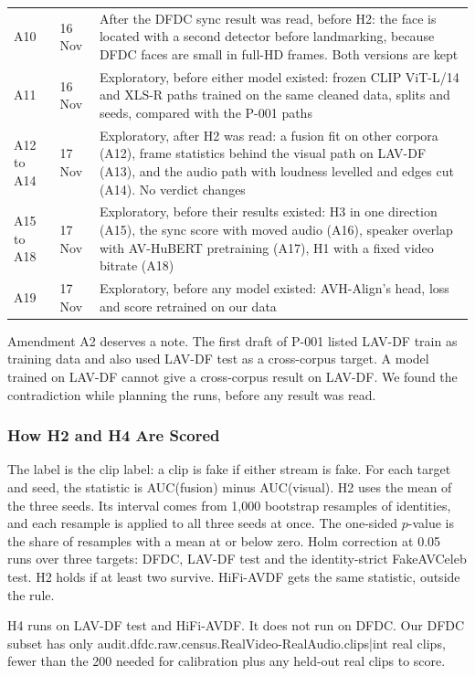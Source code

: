 \begin{table}[ht]
\begin{tabularx}{\textwidth}{@{}l l >{\raggedright\arraybackslash}X@{}}
        A10 & 16 Nov & After the DFDC sync result was read, before H2: the face is located with a second detector before landmarking, because DFDC faces are small in full-HD frames. Both versions are kept \\
        A11 & 16 Nov & Exploratory, before either model existed: frozen CLIP ViT-L/14 and XLS-R paths trained on the same cleaned data, splits and seeds, compared with the P-001 paths \\
        A12 to A14 & 17 Nov & Exploratory, after H2 was read: a fusion fit on other corpora (A12), frame statistics behind the visual path on LAV-DF (A13), and the audio path with loudness levelled and edges cut (A14). No verdict changes \\
        A15 to A18 & 17 Nov & Exploratory, before their results existed: H3 in one direction (A15), the sync score with moved audio (A16), speaker overlap with AV-HuBERT pretraining (A17), H1 with a fixed video bitrate (A18) \\
        A19 & 17 Nov & Exploratory, before any model existed: AVH-Align's head, loss and score retrained on our data \\
        \bottomrule
    \end{tabularx}
\end{table}

Amendment A2 deserves a note. The first draft of P-001 listed LAV-DF train as
training data and also used LAV-DF test as a cross-corpus target. A model
trained on LAV-DF cannot give a cross-corpus result on LAV-DF. We found the
contradiction while planning the runs, before any result was read.

\subsubsection{How H2 and H4 Are Scored}

The label is the clip label: a clip is fake if either stream is fake. For each
target and seed, the statistic is AUC(fusion) minus AUC(visual). H2 uses the
mean of the three seeds. Its interval comes from 1,000 bootstrap resamples of
identities, and each resample is applied to all three seeds at once. The
one-sided $p$-value is the share of resamples with a mean at or below zero.
Holm correction at 0.05 runs over three targets: DFDC, LAV-DF test and the
identity-strict FakeAVCeleb test. H2 holds if at least two survive. HiFi-AVDF
gets the same statistic, outside the rule.

H4 runs on LAV-DF test and HiFi-AVDF. It does not run on DFDC. Our DFDC subset
has only {{audit.dfdc.raw.census.RealVideo-RealAudio.clips|int}} real clips,
fewer than the 200 needed for calibration plus any held-out real clips to
score.

